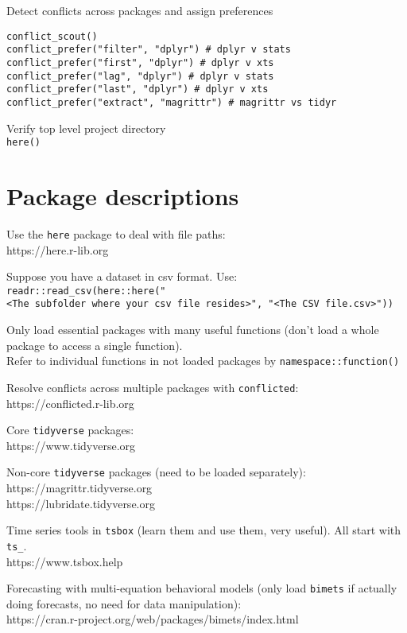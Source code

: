 \documentclass[
  letterpaper,
  DIV=11,
  numbers=noendperiod]{scrreport}
\begin{document}
Detect conflicts across packages and assign preferences

\begin{verbatim}
conflict_scout()
conflict_prefer("filter", "dplyr") # dplyr v stats
conflict_prefer("first", "dplyr") # dplyr v xts
conflict_prefer("lag", "dplyr") # dplyr v stats
conflict_prefer("last", "dplyr") # dplyr v xts
conflict_prefer("extract", "magrittr") # magrittr vs tidyr
\end{verbatim}

Verify top level project directory\\
\texttt{here()}

\section{Package descriptions}\label{package-descriptions}

Use the \texttt{here} package to deal with file paths:\\
https://here.r-lib.org

Suppose you have a dataset in csv format. Use:\\
\texttt{readr::read\_csv(here::here("\textless{}The\ subfolder\ where\ your\ csv\ file\ resides\textgreater{}",\ "\textless{}The\ CSV\ file.csv\textgreater{}"))}

Only load essential packages with many useful functions (don't load a
whole package to access a single function).\\
Refer to individual functions in not loaded packages by
\texttt{namespace::function()}

Resolve conflicts across multiple packages with \texttt{conflicted}:\\
https://conflicted.r-lib.org

Core \texttt{tidyverse} packages:\\
https://www.tidyverse.org

Non-core \texttt{tidyverse} packages (need to be loaded separately):\\
https://magrittr.tidyverse.org\\
https://lubridate.tidyverse.org

Time series tools in \texttt{tsbox} (learn them and use them, very
useful). All start with \texttt{ts\_}.\\
https://www.tsbox.help

Forecasting with multi-equation behavioral models (only load
\texttt{bimets} if actually doing forecasts, no need for data
manipulation):\\
https://cran.r-project.org/web/packages/bimets/index.html
\end{document}
